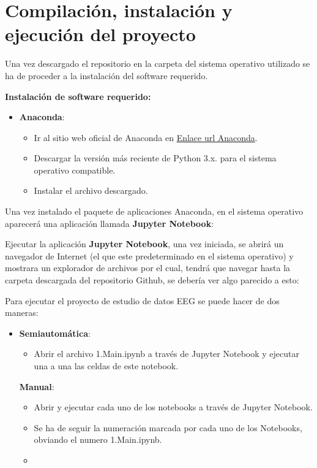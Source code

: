 \section{Compilación, instalación y ejecución del proyecto}


Una vez descargado el repositorio en la carpeta del sistema operativo utilizado se ha de proceder a la instalación del software requerido. 

\textbf{Instalación de software requerido:} 
  \begin{itemize}
   \tightlist
   \item
    \textbf{Anaconda}: 
    \begin{itemize}
   \tightlist
   \item
    Ir al sitio web oficial de Anaconda en \href{https://www.anaconda.com/download/success}{Enlace url Anaconda}. 
   \item
    Descargar la versión más reciente de Python 3.x. para el sistema operativo compatible.
   \item
   Instalar el archivo descargado.
   \end{itemize}
  \end{itemize}  


Una vez instalado el paquete de aplicaciones Anaconda, en el sistema operativo aparecerá una aplicación llamada \textbf{Jupyter Notebook}:

Ejecutar la aplicación \textbf{Jupyter Notebook}, una vez iniciada, se abrirá un navegador de Internet (el que este predeterminado en el sistema operativo) y mostrara un explorador de archivos por el cual, tendrá que navegar hasta la carpeta descargada del repositorio Github, se debería ver algo parecido a esto:




Para ejecutar el proyecto de estudio de datos EEG se puede hacer de dos maneras:

  \begin{itemize}
   \tightlist
   \item
    \textbf{Semiautomática}: 
    \begin{itemize}
   \tightlist
   \item
    Abrir el archivo 1.Main.ipynb a través de Jupyter Notebook y ejecutar una a una las celdas de este notebook.
   \end{itemize}

    \textbf{Manual}: 
    \begin{itemize}
   \tightlist
   \item
    Abrir y ejecutar cada uno de los notebooks a través de Jupyter Notebook. 
   \item
    Se ha de seguir la numeración marcada por cada uno de los Notebooks, obviando el numero 1.Main.ipynb.
   \item
   \end{itemize}   
   
  \end{itemize}  

